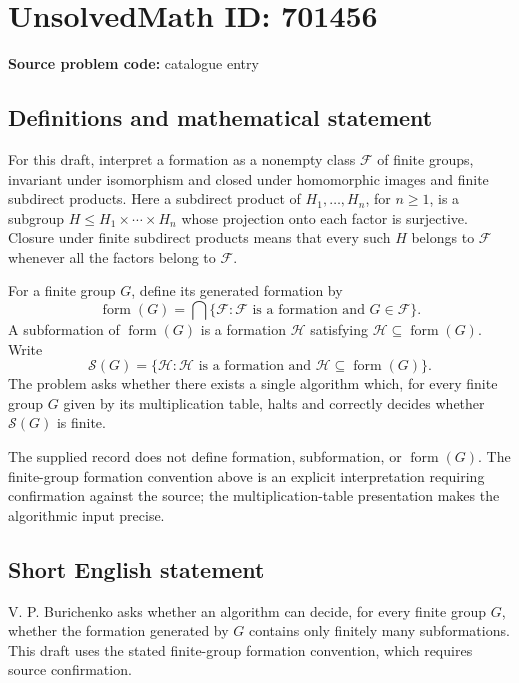 \documentclass[11pt]{article}
\begin{document}
\section*{UnsolvedMath ID: 701456}
\textbf{Source problem code:} catalogue entry
\subsection{Definitions and mathematical statement}
For this draft, interpret a formation as a nonempty class \(\mathcal F\) of finite groups, invariant under isomorphism and closed under homomorphic images and finite subdirect products. Here a subdirect product of \(H_1,\ldots,H_n\), for \(n\geq 1\), is a subgroup \(H\leq H_1\times\cdots\times H_n\) whose projection onto each factor is surjective. Closure under finite subdirect products means that every such \(H\) belongs to \(\mathcal F\) whenever all the factors belong to \(\mathcal F\).

For a finite group \(G\), define its generated formation by
\[
\operatorname{form}(G)=\bigcap\{\mathcal F:\mathcal F\text{ is a formation and }G\in\mathcal F\}.
\]
A subformation of \(\operatorname{form}(G)\) is a formation \(\mathcal H\) satisfying \(\mathcal H\subseteq\operatorname{form}(G)\). Write
\[
\mathscr S(G)=\{\mathcal H:\mathcal H\text{ is a formation and }\mathcal H\subseteq\operatorname{form}(G)\}.
\]
The problem asks whether there exists a single algorithm which, for every finite group \(G\) given by its multiplication table, halts and correctly decides whether \(\mathscr S(G)\) is finite.

The supplied record does not define formation, subformation, or \(\operatorname{form}(G)\). The finite-group formation convention above is an explicit interpretation requiring confirmation against the source; the multiplication-table presentation makes the algorithmic input precise.
\subsection{Short English statement}
V. P. Burichenko asks whether an algorithm can decide, for every finite group \(G\), whether the formation generated by \(G\) contains only finitely many subformations. This draft uses the stated finite-group formation convention, which requires source confirmation.
\end{document}
